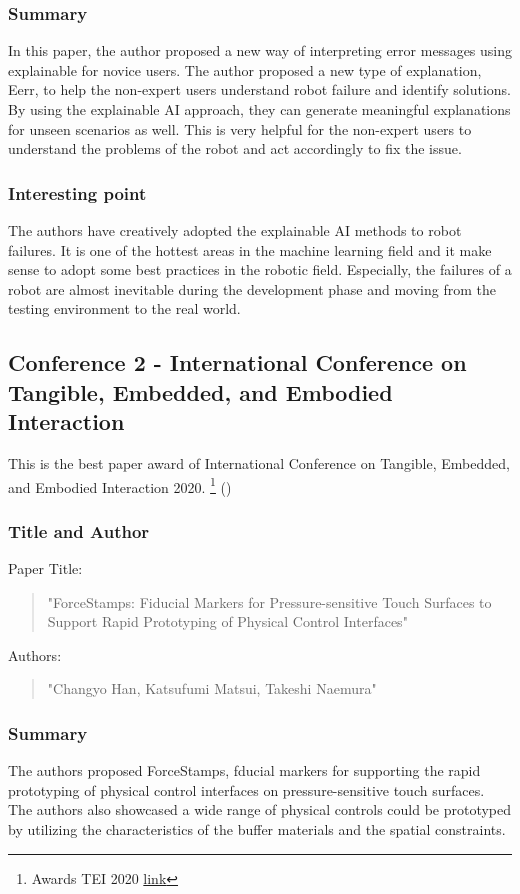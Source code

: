 \documentclass[
	letterpaper, %
]{jdf}
\begin{document}
\subsubsection{Summary}
In this paper, the author proposed a new way of interpreting error messages using explainable for novice users. The author proposed a new type of explanation, Eerr, to help the non-expert users understand robot failure and identify solutions. By using the explainable AI approach, they can generate meaningful explanations for unseen scenarios as well. This is very helpful for the non-expert users to understand the problems of the robot and act accordingly to fix the issue.


\subsubsection{Interesting point}
The authors have creatively adopted the explainable AI methods to robot failures. It is one of the hottest areas in the machine learning field and it make sense to adopt some best practices in the robotic field. Especially, the failures of a robot are almost inevitable during the development phase and moving from the testing environment to the real world. 

\subsection{Conference 2 - International Conference on Tangible, Embedded, and Embodied Interaction}
This is the best paper award of International Conference on Tangible, Embedded, and Embodied Interaction 2020. \footnote{Awards TEI 2020 \href{https://tei.acm.org/2020/}{link}}
(\cite{10.1145/3374920.3374924})
\subsubsection{Title and Author}
Paper Title:
\begin{quotation}
\noindent "ForceStamps: Fiducial Markers for Pressure-sensitive Touch Surfaces to Support Rapid Prototyping of Physical Control Interfaces" 
\end{quotation}

Authors:
\begin{quotation}
\noindent "Changyo Han, Katsufumi Matsui, Takeshi Naemura"
\end{quotation}
\subsubsection{Summary}
The authors proposed ForceStamps, fducial markers for supporting the rapid prototyping of physical control interfaces on pressure-sensitive touch surfaces. The authors also showcased a wide range of physical controls could be prototyped by utilizing the characteristics of the buffer materials and the spatial constraints.
\end{document}
